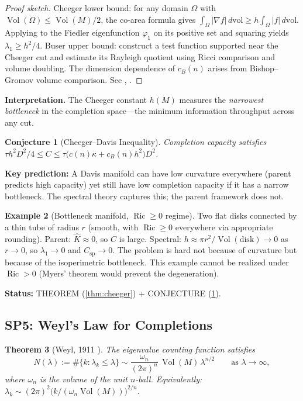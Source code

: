 \documentclass[11pt]{article}
\newtheorem{theorem}{Theorem}[section]
\newtheorem{conjecture}[theorem]{Conjecture}
\theoremstyle{definition}
\newtheorem{example}[theorem]{Example}
\theoremstyle{remark}
\newcommand{\Ric}{\operatorname{Ric}}
\newcommand{\Vol}{\operatorname{Vol}}
\newcommand{\dvol}{\,d\mathrm{vol}}
\newcommand{\Csp}{C_{\mathrm{sp}}}
\begin{document}
\begin{proof}[Proof sketch]
Cheeger lower bound: for any domain $\Omega$ with $\Vol(\Omega) \le \Vol(M)/2$, the co-area formula gives $\int_\Omega|\nabla f|\dvol \ge h\int_\Omega|f|\dvol$. Applying to the Fiedler eigenfunction $\varphi_1$ on its positive set and squaring yields $\lambda_1 \ge h^2/4$. Buser upper bound: construct a test function supported near the Cheeger cut and estimate its Rayleigh quotient using Ricci comparison and volume doubling. The dimension dependence of $c_B(n)$ arises from Bishop--Gromov volume comparison. See \cite{Cheeger}, \cite{Buser}.
\end{proof}

\textbf{Interpretation.} The Cheeger constant $h(M)$ measures the \emph{narrowest bottleneck} in the completion space---the minimum information throughput across any cut.

\begin{conjecture}[Cheeger--Davis Inequality]\label{conj:cheeger}
Completion capacity satisfies $\tau h^2 D^2/4 \le C \le \tau\bigl(c(n)\kappa + c_B(n)h^2\bigr)D^2$.
\end{conjecture}

\textbf{Key prediction:} A Davis manifold can have low curvature everywhere (parent predicts high capacity) yet still have low completion capacity if it has a narrow bottleneck. The spectral theory captures this; the parent framework does not.

\begin{example}[Bottleneck manifold, $\Ric \ge 0$ regime]
Two flat disks connected by a thin tube of radius $r$ (smooth, with $\Ric \ge 0$ everywhere via appropriate rounding). Parent: $\hat{K} \approx 0$, so $C$ is large. Spectral: $h \approx \pi r^2/\Vol(\text{disk}) \to 0$ as $r \to 0$, so $\lambda_1 \to 0$ and $\Csp \to 0$. The problem is hard not because of curvature but because of the isoperimetric bottleneck. This example cannot be realized under $\Ric > 0$ (Myers' theorem would prevent the degeneration).
\end{example}

\textbf{Status:} THEOREM (\ref{thm:cheeger}) + CONJECTURE (\ref{conj:cheeger}).


\subsection{SP5: Weyl's Law for Completions}

\begin{theorem}[Weyl, 1911 {\cite{Weyl}}]\label{thm:weyl}
The eigenvalue counting function satisfies
\[
N(\lambda) := \#\{k : \lambda_k \le \lambda\} \sim \frac{\omega_n}{(2\pi)^n}\,\Vol(M)\,\lambda^{n/2} \qquad\text{as } \lambda \to \infty,
\]
where $\omega_n$ is the volume of the unit $n$-ball. Equivalently: $\lambda_k \sim (2\pi)^2\bigl(k/(\omega_n \Vol(M))\bigr)^{2/n}$.
\end{theorem}
\end{document}
